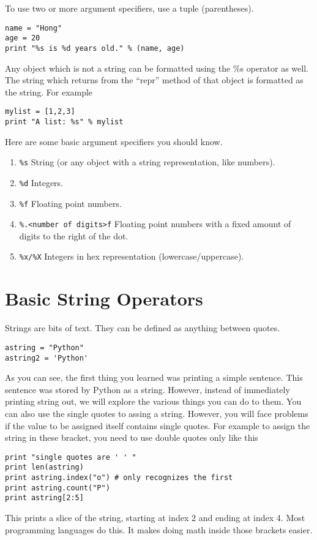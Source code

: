 \documentclass[a4paper,oneside]{book}
\numberwithin{equation}{chapter}
\begin{document}
To use two or more argument specifiers, use a tuple (parentheses).
\begin{verbatim}
name = "Hong"
age = 20
print "%s is %d years old." % (name, age)
\end{verbatim}

Any object which is not a string can be formatted using the \%s operator as well. The string which returns from the ``repr'' method of that object is formatted as the string. For example
\begin{verbatim}
mylist = [1,2,3]
print "A list: %s" % mylist
\end{verbatim}

Here are some basic argument specifiers you should know.
\begin{enumerate}
\item \verb|%s| String (or any object with a string representation, like numbers).
\item \verb|%d| Integers.
\item \verb|%f| Floating point numbers.
\item \verb|%.<number of digits>f| Floating point numbers with a fixed amount of digits to the right of the dot.
\item \verb|%x/%X| Integers in hex representation (lowercase/uppercase).
\end{enumerate}
\section{Basic String Operators}
Strings are bits of text. They can be defined as anything between quotes.
\begin{verbatim}
astring = "Python"
astring2 = 'Python'
\end{verbatim}

As you can see, the first thing you learned was printing a simple sentence. This sentence was stored by Python as a string. However, instead of immediately printing string out, we will explore the various things you can do to them. You can also use the single quotes to assing a string. However, you will face problems if the value to be assigned itself contains single quotes. For example to assign the string in these bracket, you need to use double quotes only like this
\begin{verbatim}
print "single quotes are ' ' "
print len(astring)
print astring.index("o") # only recognizes the first
print astring.count("P") 
print astring[2:5]
\end{verbatim}
This prints a slice of the string, starting at index 2 and ending at index 4. Most programming languages do this. It makes doing math inside those brackets easier.
\end{document}
